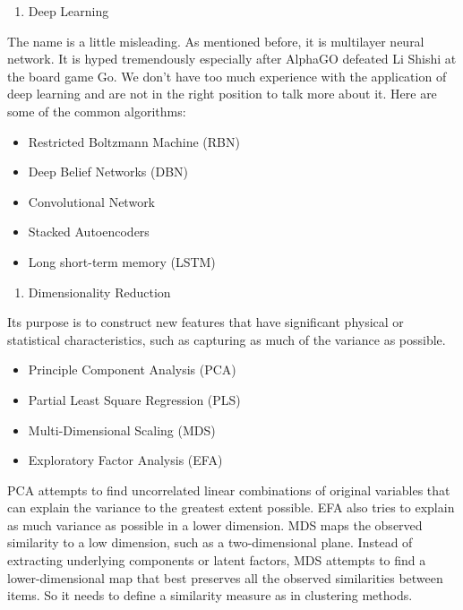 \documentclass[12pt,]{krantz}
\providecommand{\tightlist}{%
  \setlength{\itemsep}{0pt}\setlength{\parskip}{0pt}}
\theoremstyle{definition}
\theoremstyle{definition}
\theoremstyle{definition}
\theoremstyle{remark}
\begin{document}
\begin{enumerate}
\def\labelenumi{\arabic{enumi}.}
\setcounter{enumi}{10}
\tightlist
\item
  Deep Learning
\end{enumerate}

The name is a little misleading. As mentioned before, it is multilayer
neural network. It is hyped tremendously especially after AlphaGO
defeated Li Shishi at the board game Go. We don't have too much
experience with the application of deep learning and are not in the
right position to talk more about it. Here are some of the common
algorithms:

\begin{itemize}
\tightlist
\item
  Restricted Boltzmann Machine (RBN)
\item
  Deep Belief Networks (DBN)
\item
  Convolutional Network
\item
  Stacked Autoencoders
\item
  Long short-term memory (LSTM)
\end{itemize}

\begin{enumerate}
\def\labelenumi{\arabic{enumi}.}
\setcounter{enumi}{11}
\tightlist
\item
  Dimensionality Reduction
\end{enumerate}

Its purpose is to construct new features that have significant physical
or statistical characteristics, such as capturing as much of the
variance as possible.

\begin{itemize}
\tightlist
\item
  Principle Component Analysis (PCA)
\item
  Partial Least Square Regression (PLS)
\item
  Multi-Dimensional Scaling (MDS)
\item
  Exploratory Factor Analysis (EFA)
\end{itemize}

PCA attempts to find uncorrelated linear combinations of original
variables that can explain the variance to the greatest extent possible.
EFA also tries to explain as much variance as possible in a lower
dimension. MDS maps the observed similarity to a low dimension, such as
a two-dimensional plane. Instead of extracting underlying components or
latent factors, MDS attempts to find a lower-dimensional map that best
preserves all the observed similarities between items. So it needs to
define a similarity measure as in clustering methods.
\end{document}

